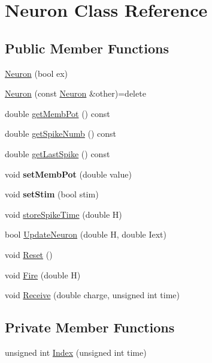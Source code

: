 \hypertarget{classNeuron}{\section{Neuron Class Reference}
\label{classNeuron}
}
\subsection*{Public Member Functions}
\begin{DoxyCompactItemize}
\item 
\hyperlink{classNeuron_adf8647dbb76779bdaaf1ff98a11d2b59}{Neuron} (bool ex)
\item 
\hyperlink{classNeuron_aff821924595676044b61101f43fb8508}{Neuron} (const \hyperlink{classNeuron}{Neuron} \&other)=delete
\item 
double \hyperlink{classNeuron_a2d5813a910d37557ab9ff24d04d75a4f}{get\-Memb\-Pot} () const 
\item 
double \hyperlink{classNeuron_ad91c2eb8b81f76a3e46db5be557a73ce}{get\-Spike\-Numb} () const 
\item 
double \hyperlink{classNeuron_a93930fdb39219c4b79d3badf76ae00f7}{get\-Last\-Spike} () const 
\item 
\hypertarget{classNeuron_a97fe240cba8e65e898ae067bd5162fa4}{void {\bfseries set\-Memb\-Pot} (double value)}\label{classNeuron_a97fe240cba8e65e898ae067bd5162fa4}

\item 
\hypertarget{classNeuron_a0963f7d7ebc82c20ace4d1d6ef891a76}{void {\bfseries set\-Stim} (bool stim)}\label{classNeuron_a0963f7d7ebc82c20ace4d1d6ef891a76}

\item 
void \hyperlink{classNeuron_ab4cb1b672d7f8c05ac55e3585de43788}{store\-Spike\-Time} (double H)
\item 
bool \hyperlink{classNeuron_a4682470ef3823d29d1cdcd0039e7cc35}{Update\-Neuron} (double H, double Iext)
\item 
void \hyperlink{classNeuron_af33d3080e1f3362351907dff15266503}{Reset} ()
\item 
void \hyperlink{classNeuron_a80a1148eedf61d90b0e85da4065e8c67}{Fire} (double H)
\item 
void \hyperlink{classNeuron_aa3ace40757da3a82159a3043bb95da64}{Receive} (double charge, unsigned int time)
\end{DoxyCompactItemize}
\subsection*{Private Member Functions}
\begin{DoxyCompactItemize}
\item 
unsigned int \hyperlink{classNeuron_a83b907bf5e2f79d915ce4742a96bb286}{Index} (unsigned int time)
\end{DoxyCompactItemize}
